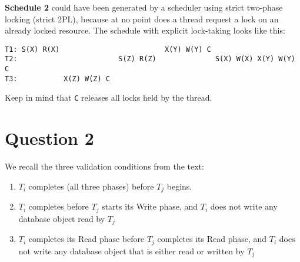 \documentclass[11pt]{article}
\begin{document}
\begin{enumerate}
  \textbf{Schedule 2} could have been generated by a scheduler using strict
  two-phase locking (strict 2PL), because at no point does a thread request a
  lock on an already locked resource. The schedule with explicit lock-taking
  looks like this:

  \begin{verbatim}
T1: S(X) R(X)                         X(Y) W(Y) C
T2:                        S(Z) R(Z)              S(X) W(X) X(Y) W(Y) C
T3:           X(Z) W(Z) C
  \end{verbatim}

  Keep in mind that \verb|C| releases all locks held by the thread.
\end{enumerate}

\section{Question 2}

We recall the three validation conditions from the text:
\begin{enumerate}
  \item
    $T_i$ completes (all three phases) before $T_j$ begins.
  \item
    $T_i$ completes before $T_j$ starts its Write phase, and $T_i$ does not
    write any database object read by $T_j$
  \item
    $T_i$ completes its Read phase before $T_j$ completes its Read phase, and
    $T_i$ does not write any database object that is either read or written by
    $T_j$
\end{enumerate}
\end{document}

